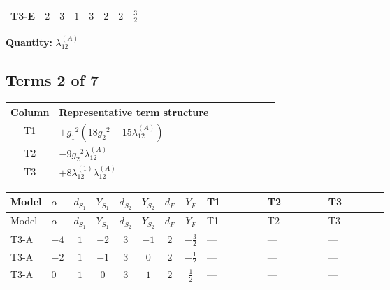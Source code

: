 \documentclass[8pt]{article}
\begin{document}
\begin{landscape}
\begin{longtable}{@{}llcccccc >{\raggedright\arraybackslash}p{0.21\linewidth} >{\raggedright\arraybackslash}p{0.21\linewidth} >{\raggedright\arraybackslash}p{0.21\linewidth}@{}}
\midrule
T3-E & $2$ & $3$ & $1$ & $3$ & $2$ & $2$ & $\frac{3}{2}$ & --- & \scriptsize\adjustbox{max width=\linewidth}{$\begin{gathered} +\frac{2}{3} \operatorname{Tr}\!\left({y_1}\,\left({y_1}\right)^{\dagger}\,{y_2}\,\left({y_2}\right)^{\dagger}\right)\end{gathered}$} & \scriptsize\adjustbox{max width=\linewidth}{$\begin{gathered} -\frac{2}{9} {\lambda_5} \left({\lambda_5}\right)^{*}\end{gathered}$} \\
\midrule
\bottomrule
\end{longtable}
\clearpage
\noindent\textbf{Quantity: }$\lambda_{12}^{(A)}$\par\smallskip
\subsection*{Terms 2 of 7}
\begin{center}
\begin{tabular}{@{}c >{\raggedright\arraybackslash}p{0.82\linewidth}@{}}
\toprule
Column & Representative term structure \\
\midrule
T1 & \(\displaystyle +{g_1}^2 \left(18 {g_2}^2-15 {\lambda_{12}^{(A)}}\right)\) \\
\midrule
T2 & \(\displaystyle -9 {g_2}^2 {\lambda_{12}^{(A)}}\) \\
\midrule
T3 & \(\displaystyle +8 {\lambda_{12}^{(1)}} {\lambda_{12}^{(A)}}\) \\
\midrule
\bottomrule
\end{tabular}
\end{center}
\smallskip
\tiny
\begin{longtable}{@{}llcccccc >{\raggedright\arraybackslash}p{0.21\linewidth} >{\raggedright\arraybackslash}p{0.21\linewidth} >{\raggedright\arraybackslash}p{0.21\linewidth}@{}}
\toprule
Model & $\alpha$ & $d_{S_1}$ & $Y_{S_1}$ & $d_{S_2}$ & $Y_{S_2}$ & $d_F$ & $Y_F$ & T1 & T2 & T3 \\
\midrule
\endfirsthead
\toprule
Model & $\alpha$ & $d_{S_1}$ & $Y_{S_1}$ & $d_{S_2}$ & $Y_{S_2}$ & $d_F$ & $Y_F$ & T1 & T2 & T3 \\
\midrule
\endhead
T3-A & $-4$ & $1$ & $-2$ & $3$ & $-1$ & $2$ & $-\frac{3}{2}$ & --- & --- & --- \\
\midrule
T3-A & $-2$ & $1$ & $-1$ & $3$ & $0$ & $2$ & $-\frac{1}{2}$ & --- & --- & --- \\
\midrule
T3-A & $0$ & $1$ & $0$ & $3$ & $1$ & $2$ & $\frac{1}{2}$ & --- & --- & --- \\

\end{longtable}
\end{landscape}
\end{document}
